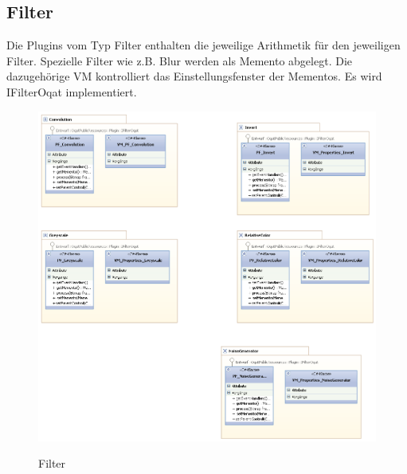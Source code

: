 \subsection{Filter}
Die Plugins vom Typ Filter enthalten die jeweilige Arithmetik für den jeweiligen Filter. Spezielle Filter wie z.B. Blur werden als Memento abgelegt. Die dazugehörige VM kontrolliert das Einstellungsfenster der Mementos. Es wird IFilterOqat  implementiert.
\begin{figure}[h]
\noindent\includegraphics[width=\linewidth,height=\textheight,
keepaspectratio]{bilder/filter.png}
\label{}
\caption{Filter}
\end{figure}


\pagebreak
